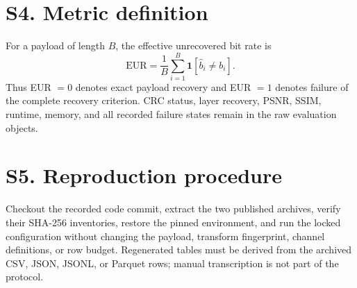 \documentclass[10pt]{article}
\begin{document}
\section*{S4. Metric definition}
For a payload of length $B$, the effective unrecovered bit rate is
\[
\mathrm{EUR}=\frac{1}{B}\sum_{i=1}^{B}\mathbf{1}[\hat b_i\ne b_i].
\]
Thus EUR $=0$ denotes exact payload recovery and EUR $=1$ denotes failure of the complete recovery criterion. CRC status, layer recovery, PSNR, SSIM, runtime, memory, and all recorded failure states remain in the raw evaluation objects.

\section*{S5. Reproduction procedure}
Checkout the recorded code commit, extract the two published archives, verify their SHA-256 inventories, restore the pinned environment, and run the locked configuration without changing the payload, transform fingerprint, channel definitions, or row budget. Regenerated tables must be derived from the archived CSV, JSON, JSONL, or Parquet rows; manual transcription is not part of the protocol.
\end{document}
